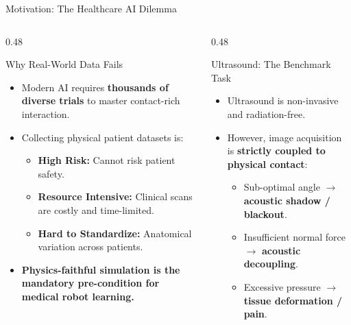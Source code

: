 \documentclass{if-beamer}
\begin{document}
\begin{frame}{Motivation: The Healthcare AI Dilemma}
    \begin{columns}[T]
        \begin{column}{0.48\textwidth}
            \begin{block}{Why Real-World Data Fails}
                \begin{itemize}
                    \item Modern AI requires \textbf{thousands of diverse trials} to master contact-rich interaction.
                    \item Collecting physical patient datasets is:
                    \begin{itemize}
                        \item \textbf{High Risk:} Cannot risk patient safety.
                        \item \textbf{Resource Intensive:} Clinical scans are costly and time-limited.
                        \item \textbf{Hard to Standardize:} Anatomical variation across patients.
                    \end{itemize}
                    \item \textbf{Physics-faithful simulation is the mandatory pre-condition for medical robot learning.}
                \end{itemize}
            \end{block}
        \end{column}
        \begin{column}{0.48\textwidth}
            \begin{alertblock}{Ultrasound: The Benchmark Task}
                \begin{itemize}
                    \item Ultrasound is non-invasive and radiation-free.
                    \item However, image acquisition is \textbf{strictly coupled to physical contact}:
                    \begin{itemize}
                        \item Sub-optimal angle $\to$ \textbf{acoustic shadow / blackout}.
                        \item Insufficient normal force $\to$ \textbf{acoustic decoupling}.
                        \item Excessive pressure $\to$ \textbf{tissue deformation / pain}.

\end{itemize}
\end{itemize}
\end{alertblock}
\end{column}
\end{columns}
\end{frame}
\end{document}
